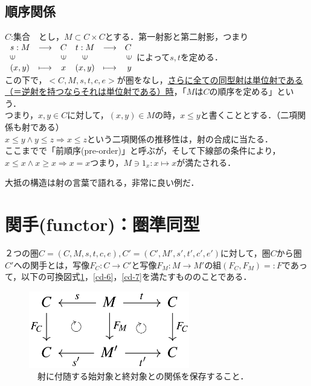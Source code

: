 \documentclass[uplatex, 12pt, a4paper, dvipdfmx]{jsarticle}
\begin{document}
\subsection{順序関係}

$C$:集合　とし，$M\subset C\times C$とする．第一射影と第二射影，つまり$\begin{array}{llccrr} s:M & \longrightarrow & C & t:M & \longrightarrow & C \\ \rotatebox{90}{$\in$} & & \rotatebox{90}{$\in$} & \rotatebox{90}{$\in$}& & \rotatebox{90}{$\in$}\\ (x,y) & \longmapsto & x & (x,y) & \longmapsto & y \end{array}$によって$s,t$を定める．\\
この下で，$<C,M,s,t,c,e>$が圏をなし，\underline{さらに全ての同型射は単位射である（＝逆射を持つならそれは単位射である）時}，「$M$は$C$の順序を定める」という．\\

つまり，$x,y\in C$に対して，$(x,y)\in M$の時，$x\le y$と書くこととする．（二項関係も射である）\\
$x\le y \wedge y\le z \Longrightarrow x\le z$という二項関係の推移性は，射の合成に当たる．\\
ここまでで「前順序(pre-order)」と呼ぶが，そして下線部の条件により，$x\le x \wedge x\ge x \Longrightarrow x=x$つまり，$M\ni 1_x:x\longmapsto x$が満たされる．

大抵の構造は射の言葉で語れる，非常に良い例だ．

\clearpage
\section{関手(functor)：圏準同型}

\begin{shadebox}\begin{definition}[関手]
    ２つの圏$C=(C,M,s,t,c,e),C'=(C',M',s',t',c',e')$に対して，圏$C$から圏$C'$への関手とは，写像$F_C:C\longrightarrow C'$と写像$F_M:M\longrightarrow M'$の組$(F_C,F_M)=:F$であって，以下の可換図式\ref{cd-5}，\ref{cd-6}，\ref{cd-7}を満たすもののことである．
\end{definition}\end{shadebox}

\begin{figure}[ht]\begin{center} \caption{\label{cd-5}　射に付随する始対象と終対象との関係を保存すること．}
    \includegraphics[width=7cm]{cd-5.png}
\end{center}\end{figure}
\end{document}
